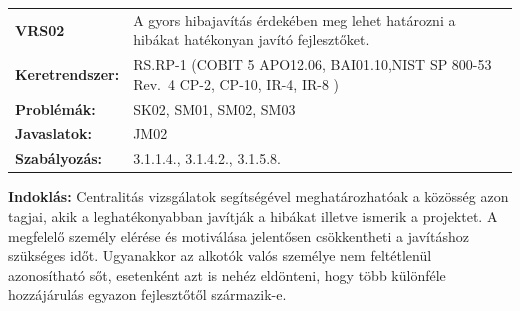 \documentclass[12pt,magyar,a4paper,oneside]{scrreprt}
\begin{document}
\begin{longtable}[]{@{}ll@{}}
\toprule
\endhead
\begin{minipage}[t]{0.16\columnwidth}\raggedright
\textbf{VRS02}\strut
\end{minipage} & \begin{minipage}[t]{0.79\columnwidth}\raggedright
A gyors hibajavítás érdekében meg lehet határozni a hibákat hatékonyan
javító fejlesztőket.\strut
\end{minipage}\tabularnewline
\begin{minipage}[t]{0.16\columnwidth}\raggedright
\textbf{Keretrendszer:}\strut
\end{minipage} & \begin{minipage}[t]{0.79\columnwidth}\raggedright
RS.RP-1 (COBIT 5 APO12.06, BAI01.10,NIST SP 800-53 Rev.~4 CP-2, CP-10,
IR-4, IR-8 )\strut
\end{minipage}\tabularnewline
\begin{minipage}[t]{0.16\columnwidth}\raggedright
\textbf{Problémák:}\strut
\end{minipage} & \begin{minipage}[t]{0.79\columnwidth}\raggedright
SK02, SM01, SM02, SM03\strut
\end{minipage}\tabularnewline
\begin{minipage}[t]{0.16\columnwidth}\raggedright
\textbf{Javaslatok:}\strut
\end{minipage} & \begin{minipage}[t]{0.79\columnwidth}\raggedright
JM02\strut
\end{minipage}\tabularnewline
\begin{minipage}[t]{0.16\columnwidth}\raggedright
\textbf{Szabályozás:}\strut
\end{minipage} & \begin{minipage}[t]{0.79\columnwidth}\raggedright
3.1.1.4., 3.1.4.2., 3.1.5.8.\strut
\end{minipage}\tabularnewline
\bottomrule
\end{longtable}

\textbf{Indoklás: } Centralitás vizsgálatok segítségével
meghatározhatóak a közösség azon tagjai, akik a leghatékonyabban
javítják a hibákat illetve ismerik a projektet. A megfelelő személy
elérése és motiválása jelentősen csökkentheti a javításhoz szükséges
időt. Ugyanakkor az alkotók valós személye nem feltétlenül azonosítható
sőt, esetenként azt is nehéz eldönteni, hogy több különféle hozzájárulás
egyazon fejlesztőtől származik-e.
\end{document}
